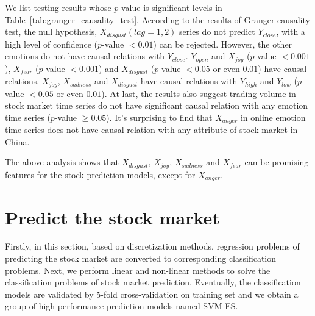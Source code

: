 \documentclass[aps,preprint,groupedaddress]{revtex4-1}
\begin{document}
We list testing results whose $p$-value is {\color{black}{required to differ}} significant levels in Table~\ref{tab:granger_causality_test}. According to the results of Granger causality test, the null hypothesis, $X_{disgust} (lag=1,2)$ series do not predict $Y_{close}$, with a high level of confidence ($p$-value $<0.01$) can be rejected. However, the other emotions do not have causal relations with $Y_{close}$. $Y_{open}$ and $X_{joy}$ ($p$-value $<0.001$), $X_{fear}$ ($p$-value $<0.001$) and $X_{disgust}$  ($p$-value $<0.05$ or even $0.01$) have causal relations. $X_{joy}$, $X_{sadness}$ and $X_{disgust}$ have causal relations with $Y_{high}$ and $Y_{low}$ ($p$-value $<0.05$ or even $0.01$). At last, the results also suggest trading volume in stock market time series do not have significant causal relation with any emotion time series ($p$-value $\geq0.05$). It's surprising to find that $X_{anger}$ in online emotion time series does not have causal relation with any attribute of stock market in China.

The above analysis shows that $X_{disgust}$, $X_{joy}$, $X_{sadness}$ and $X_{fear}$ can be promising features for the stock prediction models, except for $X_{anger}$. {\color{black}{Regarding to users of different categories like F-level I and II, the Granger causality test demonstrates the similar relations between their emotions and the market. However, for the less emotional users in F-level III, it is surprisingly found that their anger shows a slightly significant Granger causality with the market. Nevertheless, because the trivial proportion of these users in investors, their anger accordingly contributes little to the prediction model based on aggregated emotions discussed later and hence we do not offer more discussions here.}}

\section{Predict the stock market}
\label{sec:predict}

Firstly, in this section, based on discretization methods, regression problems of predicting the stock market are converted to corresponding classification problems. Next, we perform linear and non-linear methods to solve the classification problems of stock market prediction. Eventually, the classification models are validated by 5-fold cross-validation on training set and we obtain a group of high-performance prediction models named SVM-ES.
\end{document}
